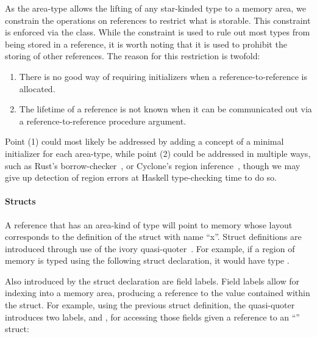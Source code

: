 As the  area-type allows the lifting of any star-kinded type to a
memory area, we constrain the operations on references to restrict what is
storable.  This constraint is enforced via the  class.  While the
 constraint is used to rule out most types from being stored in a
reference, it is worth noting that it is used to prohibit the storing of other
references.  The reason for this restriction is twofold:
\begin{enumerate}
\item   There is no good
way of requiring initializers when a reference-to-reference is allocated.
\item The lifetime of a reference is not known when it can be
communicated out via a reference-to-reference procedure argument.
\end{enumerate}

Point (1) could most likely be addressed by adding a concept of a minimal
initializer for each area-type, while point (2) could be addressed in multiple
ways, such as Rust's borrow-checker~\cite{rust}, or Cyclone's region
inference~\cite{cyclone}, though we may give up detection of region errors at
Haskell type-checking time to do so.

\paragraph{Structs} A reference that has an area-kind of type 
will point to memory whose layout corresponds to the definition of the struct
with name ``x''.  Struct definitions are introduced through use of the ivory
quasi-quoter~\cite{quoted}.  For example, if a region of memory is typed using
the following struct declaration, it would have type .

\begin{code}
\end{code}

Also introduced by the struct declaration are field labels.  Field labels allow
for indexing into a memory area, producing a reference to the value contained
within the struct.  For example, using the previous struct definition, the
quasi-quoter introduces two labels,  and , for accessing
those fields given a reference to an ``'' struct:


